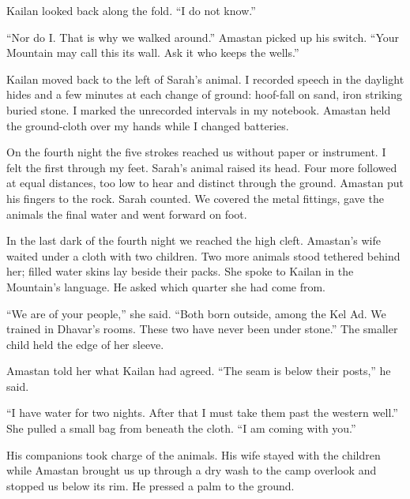 Kailan looked back along the fold. ``I do not know.''\par

``Nor do I. That is why we walked around.'' Amastan picked up his switch. ``Your Mountain may call this its wall. Ask it who keeps the wells.''\par

Kailan moved back to the left of Sarah's animal. I recorded speech in the daylight hides and a few minutes at each change of ground: hoof-fall on sand, iron striking buried stone. I marked the unrecorded intervals in my notebook. Amastan held the ground-cloth over my hands while I changed batteries.\par

On the fourth night the five strokes reached us without paper or instrument. I felt the first through my feet. Sarah's animal raised its head. Four more followed at equal distances, too low to hear and distinct through the ground. Amastan put his fingers to the rock. Sarah counted. We covered the metal fittings, gave the animals the final water and went forward on foot.\par

\ornament

In the last dark of the fourth night we reached the high cleft. Amastan's wife waited under a cloth with two children. Two more animals stood tethered behind her; filled water skins lay beside their packs. She spoke to Kailan in the Mountain's language. He asked which quarter she had come from.\par

``We are of your people,'' she said. ``Both born outside, among the Kel Ad. We trained in Dhavar's rooms. These two have never been under stone.'' The smaller child held the edge of her sleeve.\par

Amastan told her what Kailan had agreed. ``The seam is below their posts,'' he said.\par

``I have water for two nights. After that I must take them past the western well.'' She pulled a small bag from beneath the cloth. ``I am coming with you.''\par

His companions took charge of the animals. His wife stayed with the children while Amastan brought us up through a dry wash to the camp overlook and stopped us below its rim. He pressed a palm to the ground.\par

